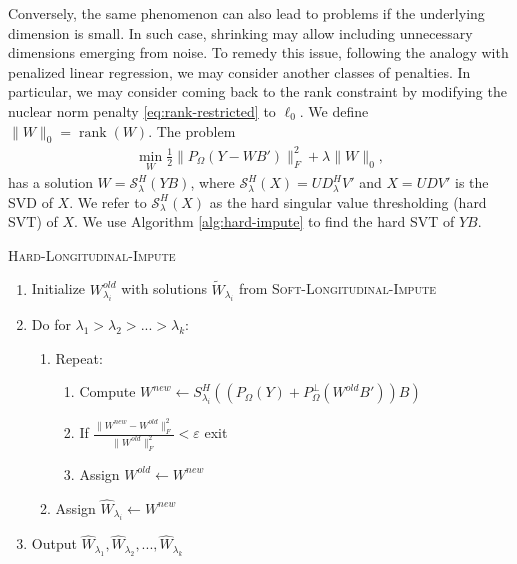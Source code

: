 \documentclass[preprint]{imsart}
\numberwithin{equation}{section}
\theoremstyle{plain}
\newcommand{\cS}{\mathcal{S}}
\DeclareMathOperator*{\rank}{rank}
\begin{document}

Conversely, the same phenomenon can also lead to problems if the underlying dimension is small. In such case, shrinking may allow including unnecessary dimensions emerging from noise. To remedy this issue, following the analogy with penalized linear regression, we may consider another classes of penalties. In particular, we may consider coming back to the rank constraint by modifying the nuclear norm penalty \eqref{eq:rank-restricted} to $\ell_0$. We define $\|W\|_0 = \rank(W)$. The problem
\begin{align}\label{eq:matrixproblem-final-l0}
\min_{W} \frac{1}{2} \|P_\Omega(Y - WB')\|_F^2 + \lambda\|W\|_0,
\end{align}
has a solution $W = \cS_\lambda^H (YB)$, where $\cS_\lambda^H(X) = UD_\lambda^H V'$ and $X = UDV'$ is the SVD of $X$. We refer to $\cS_\lambda^H(X)$ as the hard singular value thresholding (hard SVT) of $X$. We use Algorithm \ref{alg:hard-impute} to find the hard SVT of $YB$.



\begin{algorithm}
\caption{\textsc{Hard-Longitudinal-Impute}\label{alg:hard-impute}}
\begin{enumerate}
\item Initialize $W^{old}_{\lambda_i}$ with solutions $\tilde{W}_{\lambda_i}$ from \textsc{Soft-Longitudinal-Impute}
\item Do for $\lambda_1 > \lambda_2 > ... > \lambda_k$:
\begin{enumerate}
\item Repeat:
\begin{enumerate}
\item Compute $W^{new} \leftarrow S_{\lambda_i}^H( (P_\Omega(Y) + P_\Omega^\perp(W^{old}B'))B )$
\item If $\frac{\|W^{new} - W^{old}\|_F^2}{\|W^{old}\|_F^2} < \varepsilon$ exit
\item Assign $W^{old} \leftarrow W^{new}$
\end{enumerate}
\item Assign $\hat{W}_{\lambda_i} \leftarrow W^{new}$
\end{enumerate}
\item Output $\hat{W}_{\lambda_1}, \hat{W}_{\lambda_2}, ... , \hat{W}_{\lambda_k}$
\end{enumerate}
\end{algorithm}
\end{document}
